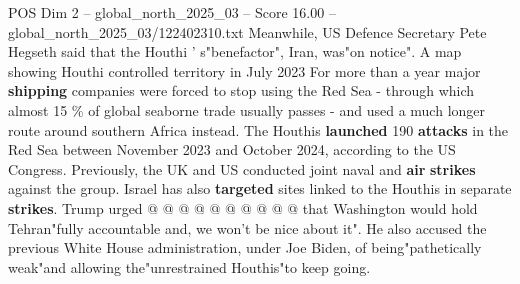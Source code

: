 \begin{textsample}{POS Dim 2 – global\_north\_2025\_03 – Score 16.00 – global\_north\_2025\_03/122402310.txt}
Meanwhile, US Defence Secretary Pete Hegseth said that the Houthi ' s"benefactor", Iran, was"on notice".
A map showing Houthi controlled territory in July 2023 For more than a year major \textbf{shipping} companies were forced to stop using the Red Sea - through which almost 15 \% of global seaborne trade usually passes - and used a much longer route around southern Africa instead.
The Houthis \textbf{launched} 190 \textbf{attacks} in the Red Sea between November 2023 and October 2024, according to the US Congress.
Previously, the UK and US conducted joint naval and \textbf{air} \textbf{strikes} against the group.
Israel has also \textbf{targeted} sites linked to the Houthis in separate \textbf{strikes}.
Trump urged @ @ @ @ @ @ @ @ @ @ that Washington would hold Tehran"fully accountable and, we won't be nice about it".
He also accused the previous White House administration, under Joe Biden, of being"pathetically weak"and allowing the"unrestrained Houthis"to keep going.

\end{textsample}
